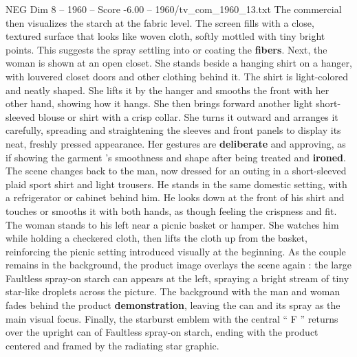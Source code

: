\begin{textsample}{NEG Dim 8 – 1960 – Score -6.00 – 1960/tv\_com\_1960\_13.txt}
The commercial then visualizes the starch at the fabric level.
The screen fills with a close, textured surface that looks like woven cloth, softly mottled with tiny bright points.
This suggests the spray settling into or coating the \textbf{fibers}.
Next, the woman is shown at an open closet.
She stands beside a hanging shirt on a hanger, with louvered closet doors and other clothing behind it.
The shirt is light-colored and neatly shaped.
She lifts it by the hanger and smooths the front with her other hand, showing how it hangs.
She then brings forward another light short-sleeved blouse or shirt with a crisp collar.
She turns it outward and arranges it carefully, spreading and straightening the sleeves and front panels to display its neat, freshly pressed appearance.
Her gestures are \textbf{deliberate} and approving, as if showing the garment ’s smoothness and shape after being treated and \textbf{ironed}.
The scene changes back to the man, now dressed for an outing in a short-sleeved plaid sport shirt and light trousers.
He stands in the same domestic setting, with a refrigerator or cabinet behind him.
He looks down at the front of his shirt and touches or smooths it with both hands, as though feeling the crispness and fit.
The woman stands to his left near a picnic basket or hamper.
She watches him while holding a checkered cloth, then lifts the cloth up from the basket, reinforcing the picnic setting introduced visually at the beginning.
As the couple remains in the background, the product image overlays the scene again : the large Faultless spray-on starch can appears at the left, spraying a bright stream of tiny star-like droplets across the picture.
The background with the man and woman fades behind the product \textbf{demonstration}, leaving the can and its spray as the main visual focus.
Finally, the starburst emblem with the central “ F ” returns over the upright can of Faultless spray-on starch, ending with the product centered and framed by the radiating star graphic.

\end{textsample}
